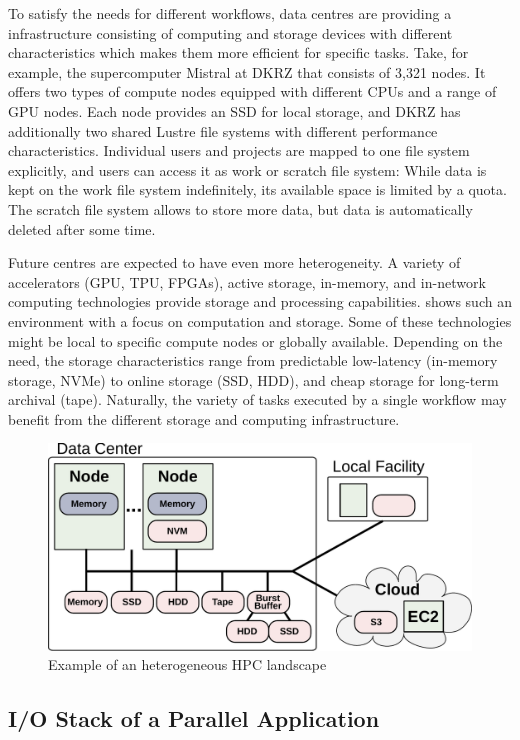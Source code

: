 \documentclass[a4paper]{article}
\newcommand{\jk}[1]{\todo[inline]{JK: #1}}
\begin{document}
To satisfy the needs for different workflows, data centres are providing a infrastructure consisting of computing and storage devices with different characteristics which makes them more efficient for specific tasks.
Take, for example, the supercomputer Mistral at DKRZ that consists of 3,321 nodes.
It offers two types of compute nodes equipped with different CPUs and a range of GPU nodes.
Each node provides an SSD for local storage, and DKRZ has additionally two shared Lustre file systems with different performance characteristics.
Individual users and projects are mapped to one file system explicitly, and users can access it as work or scratch file system: While data is kept on the work file system indefinitely, its available space is limited by a quota.
The scratch file system allows to store more data, but data is automatically deleted after some time.

Future centres are expected to have even more heterogeneity. A variety of accelerators (GPU, TPU, FPGAs), active storage, in-memory, and in-network computing technologies provide storage and processing capabilities.
 shows such an environment with a focus on computation and storage.
Some of these technologies might be local to specific compute nodes or globally available.
Depending on the need, the storage characteristics range from predictable low-latency (in-memory storage, NVMe) to online storage (SSD, HDD), and cheap storage for long-term archival (tape).
\jk{Mention BBs, e.g., DDN IME}
Naturally, the variety of tasks executed by a single workflow may benefit from the different storage and computing infrastructure.

\begin{figure}[H]
  \centering
  \includegraphics[width=0.6\columnwidth]{system}
  \caption{Example of an heterogeneous HPC landscape}
  \label{fig:heterogeneous}
\end{figure}


\subsection{I/O Stack of a Parallel Application}
\end{document}
